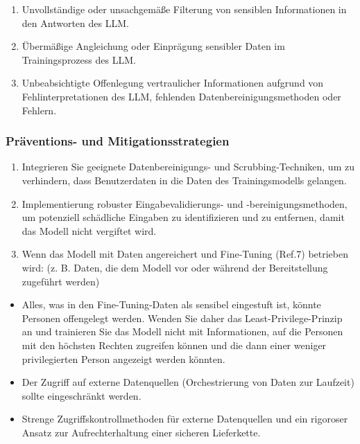 \documentclass[
]{article}
\providecommand{\tightlist}{%
  \setlength{\itemsep}{0pt}\setlength{\parskip}{0pt}}
\begin{document}
\begin{enumerate}
\def\labelenumi{\arabic{enumi}.}
\tightlist
\item
  Unvollständige oder unsachgemäße Filterung von sensiblen Informationen
  in den Antworten des LLM.
\item
  Übermäßige Angleichung oder Einprägung sensibler Daten im
  Trainingsprozess des LLM.
\item
  Unbeabsichtigte Offenlegung vertraulicher Informationen aufgrund von
  Fehlinterpretationen des LLM, fehlenden Datenbereinigungsmethoden oder
  Fehlern.
\end{enumerate}

\subsubsection{Präventions- und
Mitigationsstrategien}\label{pruxe4ventions--und-mitigationsstrategien}

\begin{enumerate}
\def\labelenumi{\arabic{enumi}.}
\tightlist
\item
  Integrieren Sie geeignete Datenbereinigungs- und Scrubbing-Techniken,
  um zu verhindern, dass Benutzerdaten in die Daten des Trainingsmodells
  gelangen.
\item
  Implementierung robuster Eingabevalidierungs- und
  -bereinigungsmethoden, um potenziell schädliche Eingaben zu
  identifizieren und zu entfernen, damit das Modell nicht vergiftet
  wird.
\item
  Wenn das Modell mit Daten angereichert und Fine-Tuning (Ref.7)
  betrieben wird: (z. B. Daten, die dem Modell vor oder während der
  Bereitstellung zugeführt werden)
\end{enumerate}

\begin{itemize}
\tightlist
\item
  Alles, was in den Fine-Tuning-Daten als sensibel eingestuft ist,
  könnte Personen offengelegt werden. Wenden Sie daher das
  Least-Privilege-Prinzip an und trainieren Sie das Modell nicht mit
  Informationen, auf die Personen mit den höchsten Rechten zugreifen
  können und die dann einer weniger privilegierten Person angezeigt
  werden könnten.
\item
  Der Zugriff auf externe Datenquellen (Orchestrierung von Daten zur
  Laufzeit) sollte eingeschränkt werden.
\item
  Strenge Zugriffskontrollmethoden für externe Datenquellen und ein
  rigoroser Ansatz zur Aufrechterhaltung einer sicheren Lieferkette.
\end{itemize}
\end{document}
